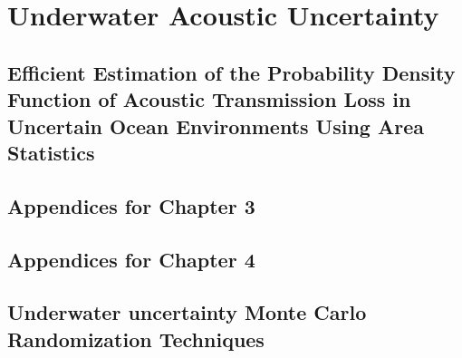\documentclass[submit]{./tex/thesis-umich}
\begin{document}
\acresetall
\part{Underwater Acoustic Uncertainty} \label{part:uw_uncertainty}
\chapter{Efficient Estimation of the Probability Density Function of Acoustic Transmission Loss in Uncertain Ocean Environments Using Area Statistics}\label{ch:astats}



\appendix
\begin{appendices}
  \chapter{Appendices for Chapter 3}%
  
  \chapter{Appendices for Chapter 4}%
  
  \chapter{Underwater uncertainty Monte Carlo Randomization Techniques}
  

  \begin{comment}
  \end{comment}


\end{appendices}
\end{document}
